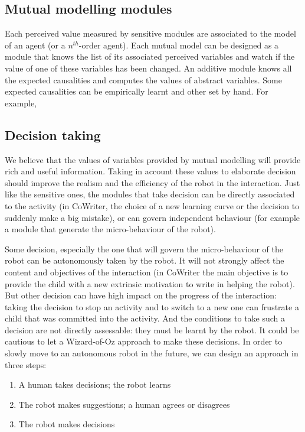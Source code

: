 \documentclass[10pt,a4paper,twocolumn]{article}
\begin{document}
\subsection{Mutual modelling modules}

Each perceived value measured by sensitive modules are associated to the model of an agent (or a $n^{th}$-order agent). Each mutual model can be designed as a module that knows the list of its associated perceived variables and watch if the value of one of these variables has been changed. An additive module knows all the expected causalities and computes the values of abstract variables. Some expected causalities can be empirically learnt and other set by hand. For example, 

\subsection{Decision taking}

We believe that the values of variables provided by mutual modelling will provide rich and useful information. Taking in account these values to elaborate decision should improve the realism and the efficiency of the robot in the interaction.
Just like the sensitive ones, the modules that take decision can be directly associated to the activity (in CoWriter, the choice of a new learning curve or the decision to suddenly make a big mistake), or can govern independent behaviour (for example a module that generate the micro-behaviour of the robot).

Some decision, especially the one that will govern the micro-behaviour of the robot can be autonomously taken by the robot. It will not strongly affect the content and objectives of the interaction (in CoWriter the main objective is to provide the child with a new extrinsic motivation to write in helping the robot). But other decision can have high impact on the progress of the interaction: taking the decision to stop an activity and to switch to a new one can frustrate a child that was committed into the activity. And the conditions to take such a decision are not directly assessable: they must be learnt by the robot. It could be cautious to let a Wizard-of-Oz approach to make these decisions. In order to slowly move to an autonomous robot in the future, we can design an approach in three steps:
\begin{enumerate}
\item A human takes decisions; the robot learns
\item The robot makes suggestions; a human agrees or disagrees
\item The robot makes decisions
\end{enumerate}
\end{document}
